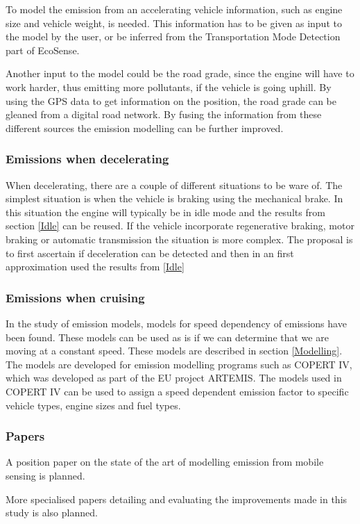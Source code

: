 To model the emission from an accelerating vehicle information, such as engine size and vehicle weight, is needed. This information has to be given as input to the model by the user, or be inferred from the Transportation Mode Detection part of EcoSense.

Another input to the model could be the road grade, since the engine will have to work harder, thus emitting more pollutants, if the vehicle is going uphill. By using the GPS data to get information on the position, the road grade can be gleaned from a digital road network. By fusing the information from these different sources the emission modelling  can be further improved.  

\subsubsection{Emissions when decelerating}
When decelerating, there are a couple of different situations to be ware of. The simplest situation is when the vehicle is braking using the mechanical brake. In this situation the engine will typically be in idle mode and the results from section \ref{Idle} can be reused. If the vehicle incorporate regenerative braking, motor braking or automatic transmission the situation is more complex. The proposal is to first ascertain if deceleration can be detected and then in an first approximation used the results from \ref{Idle}
\subsubsection{Emissions when cruising}
In the study of emission models, models for speed dependency of emissions have been found. These models can be used as is if we can determine that we are moving at a constant speed. These models are described in section \ref{Modelling}. The models are developed for emission modelling programs such as COPERT IV, which was developed as part of the EU project ARTEMIS. The models used in COPERT IV can be used to assign a speed dependent emission factor to specific vehicle types, engine sizes and fuel types.
 
\subsubsection{Papers}
A position paper on the state of the art of modelling emission from mobile sensing is planned.

More specialised papers detailing and evaluating the improvements made in this study is also planned.


